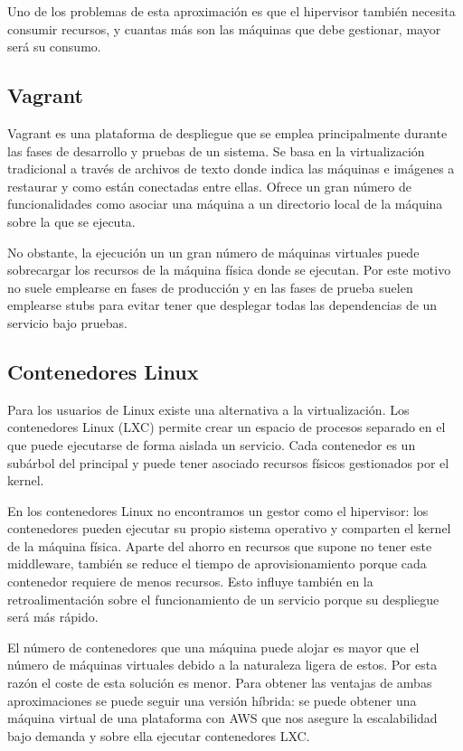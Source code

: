 \documentclass[11pt,a4paper]{article}
\begin{document}
Uno de los problemas de esta aproximación es que el hipervisor también necesita consumir recursos, y cuantas más son las máquinas que debe gestionar, mayor será su consumo.

\subsection{Vagrant}

Vagrant es una plataforma de despliegue que se emplea principalmente durante las fases de desarrollo y pruebas de un sistema. Se basa en la virtualización tradicional a través de archivos de texto donde indica las máquinas e imágenes a restaurar y como están conectadas entre ellas. Ofrece un gran número de funcionalidades como asociar una máquina a un directorio local de la máquina sobre la que se ejecuta.

No obstante, la ejecución un un gran número de máquinas virtuales puede sobrecargar los recursos de la máquina física donde se ejecutan. Por este motivo no suele emplearse en fases de producción y en las fases de prueba suelen emplearse stubs para evitar tener que desplegar todas las dependencias de un servicio bajo pruebas.

\subsection{Contenedores Linux}

Para los usuarios de Linux existe una alternativa a la virtualización. Los contenedores Linux (LXC) permite crear un espacio de procesos separado en el que puede ejecutarse de forma aislada un servicio. Cada contenedor es un subárbol del principal y puede tener asociado recursos físicos gestionados por el kernel.

En los contenedores Linux no encontramos un gestor como el hipervisor: los contenedores pueden ejecutar su propio sistema operativo y comparten el kernel de la máquina física. Aparte del ahorro en recursos que supone no tener este middleware, también se reduce el tiempo de aprovisionamiento porque cada contenedor requiere de menos recursos. Esto influye también en la retroalimentación sobre el funcionamiento de un servicio porque su despliegue será más rápido.

El número de contenedores que una máquina puede alojar es mayor que el número de máquinas virtuales debido a la naturaleza ligera de estos. Por esta razón el coste de esta solución es menor. Para obtener las ventajas de ambas aproximaciones se puede seguir una versión híbrida: se puede obtener una máquina virtual de una plataforma con AWS que nos asegure la escalabilidad bajo demanda y sobre ella ejecutar contenedores LXC.
\end{document}
